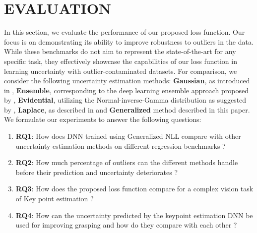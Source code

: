 \documentclass[letterpaper, 10 pt, conference]{ieeeconf}  %
\begin{document}
\section{EVALUATION}
In this section, we evaluate the performance of our proposed loss function. Our focus is on demonstrating its ability to improve robustness to outliers in the data. While these benchmarks do not aim to represent the state-of-the-art for any specific task, they effectively showcase the capabilities of our loss function in learning uncertainty with outlier-contaminated datasets. For comparison, we consider the following uncertainty estimation methods: \textbf{Gaussian}, as introduced in \cite{nix1994estimating}, \textbf{Ensemble}, corresponding to the deep learning ensemble approach proposed by \cite{lakshminarayanan_simple_2016}, \textbf{Evidential}, utilizing the Normal-inverse-Gamma distribution as suggested by \cite{amini_deep_2019},  \textbf{Laplace}, as described in \cite{nair_laplace_2O22} and \textbf{Generalized} method described in this paper.
We formulate our experiments to answer the following questions:
\begin{enumerate}
    \item \textbf{RQ1}: How does DNN trained using Generalized NLL compare with other uncertainty estimation methods on different regression benchmarks ?
    \item \textbf{RQ2}: How much percentage of outliers can the different methods handle before their prediction and uncertainty deteriorates ?
    \item \textbf{RQ3}: How does the proposed loss function compare for a complex vision task of Key point estimation ?
    \item \textbf{RQ4}: How can the uncertainty predicted by the keypoint estimation DNN be used for improving grasping and how do they compare with each other ?
\end{enumerate}
\end{document}
